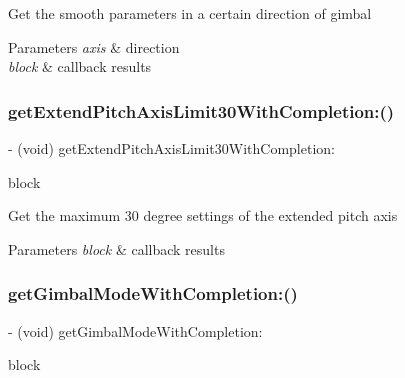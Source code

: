 Get the smooth parameters in a certain direction of gimbal


\begin{DoxyParams}{Parameters}
{\em axis} & direction \\
\hline
{\em block} & callback results \\
\hline
\end{DoxyParams}
\mbox{\label{interface_p_v_gimabal_aa2a594744332480f17f85aec2a22f4bf}} 
\subsubsection{\texorpdfstring{get\+Extend\+Pitch\+Axis\+Limit30\+With\+Completion\+:()}{getExtendPitchAxisLimit30WithCompletion:()}}
{\footnotesize\ttfamily -\/ (void) get\+Extend\+Pitch\+Axis\+Limit30\+With\+Completion\+: \begin{DoxyParamCaption}\item[{(void($^\wedge$)(B\+O\+OL is\+Extend, N\+S\+Error $\ast$\+\_\+\+Nullable error))}]{block }\end{DoxyParamCaption}}

Get the maximum 30 degree settings of the extended pitch axis


\begin{DoxyParams}{Parameters}
{\em block} & callback results \\
\hline
\end{DoxyParams}
\mbox{\label{interface_p_v_gimabal_a05eb12c923045267506ab6afc2f97275}} 
\subsubsection{\texorpdfstring{get\+Gimbal\+Mode\+With\+Completion\+:()}{getGimbalModeWithCompletion:()}}
{\footnotesize\ttfamily -\/ (void) get\+Gimbal\+Mode\+With\+Completion\+: \begin{DoxyParamCaption}\item[{(void($^\wedge$)(P\+V\+Gimbal\+Mode gimbal\+Mode, N\+S\+Error $\ast$\+\_\+\+Nullable error))}]{block }\end{DoxyParamCaption}}

